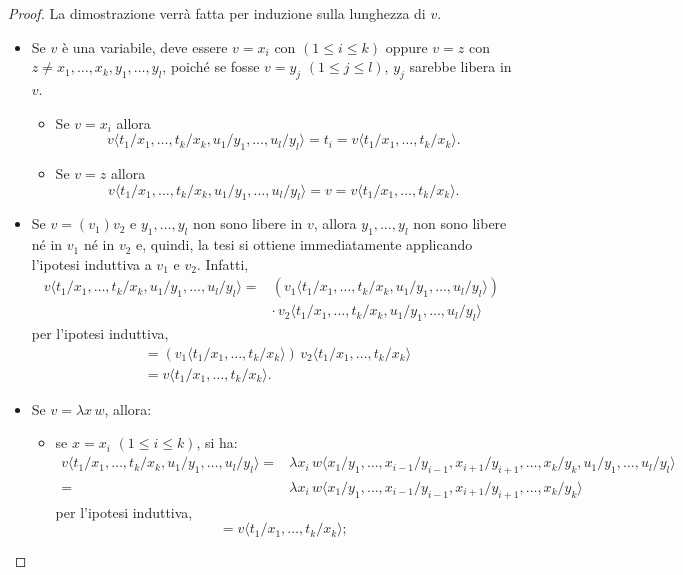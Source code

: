 \begin{proof}
La dimostrazione verrà fatta per induzione sulla lunghezza di $v$.
\begin{itemize}
    \item Se $v$ è una variabile, deve essere $v=x_i$ con $(1\le i\le k)$ oppure $v=z$ con $z\neq x_1,\dots,x_k,y_1,\dots,y_l$, poiché se fosse $v=y_j$ $(1\le j\le l)$, $y_j$ sarebbe libera in $v$.
    \begin{itemize}
        \item Se $v=x_i$ allora
        \[
        v\langle t_1/x_1,\dots,t_k/x_k,u_1/y_1,\dots,u_l/y_l\rangle=t_i=v\langle t_1/x_1,\dots,t_k/x_k\rangle.
        \]
        \item Se $v=z$ allora
        \[
        v\langle t_1/x_1,\dots,t_k/x_k,u_1/y_1,\dots,u_l/y_l\rangle=v=v\langle t_1/x_1,\dots,t_k/x_k\rangle.
        \]
    \end{itemize}
    \item Se $v=(v_1)v_2$ e $y_1,\dots,y_l$ non sono libere in $v$, allora $y_1,\dots,y_l$ non sono libere né in $v_1$ né in $v_2$ e, quindi, la tesi si ottiene immediatamente applicando l'ipotesi induttiva a $v_1$ e $v_2$. Infatti,
    \begin{align*}
    v\langle t_1/x_1,\dots,t_k/x_k,u_1/y_1,\dots,u_l/y_l\rangle={}&(v_1\langle t_1/x_1,\dots,t_k/x_k,u_1/y_1,\dots,u_l/y_l\rangle)\\
    &\cdot\,v_2\langle t_1/x_1,\dots,t_k/x_k,u_1/y_1,\dots,u_l/y_l\rangle
    \end{align*}
    per l'ipotesi induttiva,
    \begin{align*}
    &={}(v_1\langle t_1/x_1,\dots,t_k/x_k\rangle)\,v_2\langle t_1/x_1,\dots,t_k/x_k\rangle\\
    &={}v\langle t_1/x_1,\dots,t_k/x_k\rangle.
    \end{align*}
    \item Se $v=\lambda x\,w$, allora:
    \begin{itemize}
        \item se $x=x_i$ $(1\le i\le k)$, si ha:
        \begin{align*}
        v\langle t_1/x_1,\dots,t_k/x_k,u_1/y_1,\dots,u_l/y_l\rangle={}&\lambda x_i\,w\langle x_1/y_1,\dots,x_{i-1}/y_{i-1},x_{i+1}/y_{i+1},\dots,x_k/y_k,u_1/y_1,\dots,u_l/y_l\rangle\\
        ={}&\lambda x_i\,w\langle x_1/y_1,\dots,x_{i-1}/y_{i-1},x_{i+1}/y_{i+1},\dots,x_k/y_k\rangle
        \end{align*}
        per l'ipotesi induttiva,
        \[
        =v\langle t_1/x_1,\dots,t_k/x_k\rangle;
        \]
    \end{itemize}
\end{itemize}
\end{proof}